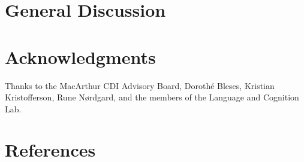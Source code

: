 \documentclass[10pt,letterpaper]{article}
\begin{document}
\section{General Discussion}

\section{Acknowledgments}

Thanks to the MacArthur CDI Advisory Board, Doroth\'e Bleses, Kristian Kristofferson, Rune N\o rdgard, and the members of the Language and Cognition Lab. 

\section{References}



\setlength{\bibleftmargin}{.125in}
\setlength{\bibindent}{-\bibleftmargin}


\end{document}
